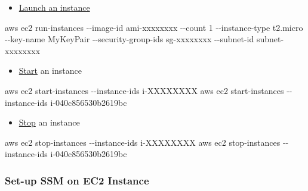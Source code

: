 \documentclass[
]{book}
\newenvironment{Shaded}{\begin{snugshade}}{\end{snugshade}}
\newcommand{\ExtensionTok}[1]{#1}
\newcommand{\NormalTok}[1]{#1}
\providecommand{\tightlist}{%
  \setlength{\itemsep}{0pt}\setlength{\parskip}{0pt}}
\begin{document}
\begin{enumerate}
  \begin{itemize}
  \tightlist
  \item
    \href{https://docs.aws.amazon.com/cli/latest/userguide/cli-ec2-launch.html}{Launch an instance}
  \end{itemize}

\begin{Shaded}
\begin{Highlighting}[]
\ExtensionTok{aws}\NormalTok{ ec2 run{-}instances {-}{-}image{-}id ami{-}xxxxxxxx {-}{-}count 1 {-}{-}instance{-}type t2.micro {-}{-}key{-}name MyKeyPair {-}{-}security{-}group{-}ids sg{-}xxxxxxxx {-}{-}subnet{-}id subnet{-}xxxxxxxx}
\end{Highlighting}
\end{Shaded}

  \begin{itemize}
  \tightlist
  \item
    \href{https://docs.aws.amazon.com/cli/latest/reference/ec2/start-instances.html}{Start} an instance
  \end{itemize}

\begin{Shaded}
\begin{Highlighting}[]
\ExtensionTok{aws}\NormalTok{ ec2 start{-}instances {-}{-}instance{-}ids i{-}XXXXXXXX}
\ExtensionTok{aws}\NormalTok{ ec2 start{-}instances {-}{-}instance{-}ids i{-}040c856530b2619bc}
\end{Highlighting}
\end{Shaded}

  \begin{itemize}
  \tightlist
  \item
    \href{https://docs.aws.amazon.com/cli/latest/reference/ec2/stop-instances.html}{Stop} an instance
  \end{itemize}

\begin{Shaded}
\begin{Highlighting}[]
\ExtensionTok{aws}\NormalTok{ ec2 stop{-}instances {-}{-}instance{-}ids i{-}XXXXXXXX}
\ExtensionTok{aws}\NormalTok{ ec2 stop{-}instances {-}{-}instance{-}ids i{-}040c856530b2619bc}
\end{Highlighting}
\end{Shaded}
\end{enumerate}

\hypertarget{set-up-ssm-on-ec2-instance}{%
\subsubsection{Set-up SSM on EC2 Instance}\label{set-up-ssm-on-ec2-instance}}
\end{document}
